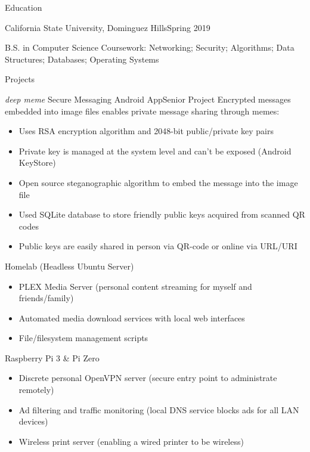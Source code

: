 \documentclass[]{mcdowellcv}
\begin{document}
	\makeheader
	
	\begin{cvsection}{Education}
		\begin{cvsubsection}{California State University, Dominguez Hills}{Spring 2019}
			
			\par B.S. in Computer Science
			\newline Coursework: Networking; Security; Algorithms; Data Structures; Databases; Operating Systems
			
		\end{cvsubsection}
	\end{cvsection}

	\begin{cvsection}{Projects}
		\begin{cvsubsection}{\emph{deep meme} Secure Messaging Android App}{Senior Project}
			Encrypted messages embedded into image files enables private message sharing through memes: 
			\begin{itemize}[topsep=-3pt]
				\item Uses RSA encryption algorithm and 2048-bit public/private key pairs
				\item Private key is managed at the system level and can't be exposed (Android KeyStore)
				\item Open source steganographic algorithm to embed the message into the image file
				\item Used SQLite database to store friendly public keys acquired from scanned QR codes
				\item Public keys are easily shared in person via QR-code or online via URL/URI
			\end{itemize}
		\end{cvsubsection}
		
		\begin{cvsubsection}{Homelab (Headless Ubuntu Server)}{}
			\begin{itemize}
				\item PLEX Media Server (personal content streaming for myself and friends/family)
				\item Automated media download services with local web interfaces
				\item File/filesystem management scripts
			\end{itemize}
		\end{cvsubsection}
		\begin{cvsubsection}{Raspberry Pi 3 \& Pi Zero}{}
			\begin{itemize}
				\item Discrete personal OpenVPN server (secure entry point to administrate remotely)
				\item Ad filtering and traffic monitoring (local DNS service blocks ads for all LAN devices)
				\item Wireless print server (enabling a wired printer to be wireless)
			\end{itemize}
		\end{cvsubsection}
		

\end{cvsection}
\end{document}
